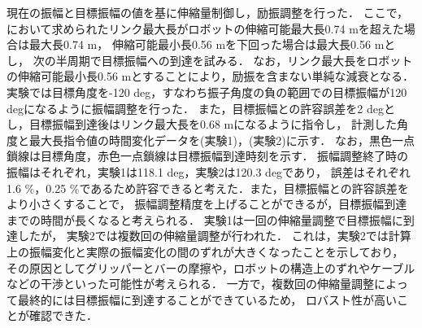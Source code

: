         現在の振幅と目標振幅の値を基に伸縮量制御し，励振調整を行った．
        ここで，において求められたリンク最大長がロボットの伸縮可能最大長0.74 mを超えた場合は最大長0.74 m，
        伸縮可能最小長0.56 mを下回った場合は最大長0.56 mとし，
        次の半周期で目標振幅への到達を試みる．
        なお，リンク最大長をロボットの伸縮可能最小長0.56 mとすることにより，励振を含まない単純な減衰となる．
        実験では目標角度を-120 deg，すなわち振子角度の負の範囲での目標振幅が120 degになるように振幅調整を行った．
        また，目標振幅との許容誤差を2 degとし，目標振幅到達後はリンク最大長を0.68 mになるように指令し，
        計測した角度と最大長指令値の時間変化データを(実験1)，(実験2)に示す．
        なお，黒色一点鎖線は目標角度，赤色一点鎖線は目標振幅到達時刻を示す．
        振幅調整終了時の振幅はそれぞれ，実験1は118.1 deg，実験2は120.3 degであり，
        誤差はそれぞれ1.6 $\%$，0.25 $\%$であるため許容できると考えた．また，目標振幅との許容誤差をより小さくすることで，
        振幅調整精度を上げることができるが，目標振幅到達までの時間が長くなると考えられる．
        実験1は一回の伸縮量調整で目標振幅に到達したが，
        実験2では複数回の伸縮量調整が行われた．
        これは，実験2では計算上の振幅変化と実際の振幅変化の間のずれが大きくなったことを示しており，
        その原因としてグリッパーとバーの摩擦や，ロボットの構造上のずれやケーブルなどの干渉といった可能性が考えられる．
        一方で，複数回の伸縮量調整によって最終的には目標振幅に到達することができているため，
        ロバスト性が高いことが確認できた．
        





          


